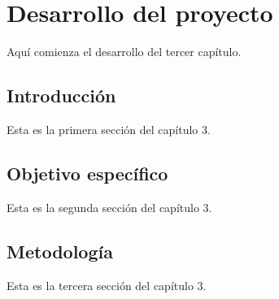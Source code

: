 \chapter{Desarrollo del proyecto}
\label{cap:desarrollo}

Aquí comienza el desarrollo del tercer capítulo.

\section{Introducción}
Esta es la primera sección del capítulo 3.

\section{Objetivo específico}
Esta es la segunda sección del capítulo 3.

\section{Metodología}
Esta es la tercera sección del capítulo 3.